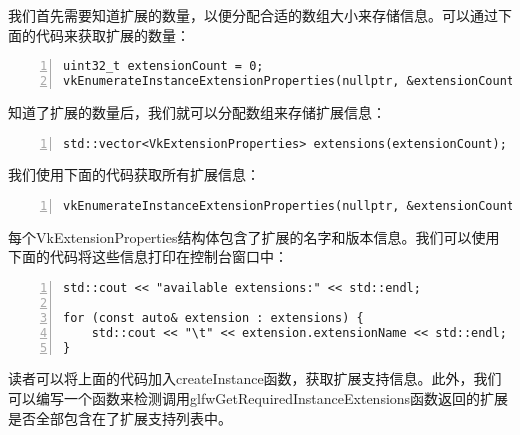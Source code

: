 \documentclass{ctexart}
\begin{document}
我们首先需要知道扩展的数量，以便分配合适的数组大小来存储信息。可以通过下面的代码来获取扩展的数量：

\begin{lstlisting}[language={[ANSI]C},keywordstyle=\color{blue!70},commentstyle=\color{red!50!green!50!blue!50},frame=shadowbox, rulesepcolor=\color{red!20!green!20!blue!20},basicstyle=\small,numbers=left, numberstyle=\tiny,breaklines=true]
uint32_t extensionCount = 0;
vkEnumerateInstanceExtensionProperties(nullptr, &extensionCount, nullptr);
\end{lstlisting}

知道了扩展的数量后，我们就可以分配数组来存储扩展信息：

\begin{lstlisting}[language={[ANSI]C},keywordstyle=\color{blue!70},commentstyle=\color{red!50!green!50!blue!50},frame=shadowbox, rulesepcolor=\color{red!20!green!20!blue!20},basicstyle=\small,numbers=left, numberstyle=\tiny,breaklines=true]
std::vector<VkExtensionProperties> extensions(extensionCount);
\end{lstlisting}

我们使用下面的代码获取所有扩展信息：

\begin{lstlisting}[language={[ANSI]C},keywordstyle=\color{blue!70},commentstyle=\color{red!50!green!50!blue!50},frame=shadowbox, rulesepcolor=\color{red!20!green!20!blue!20},basicstyle=\small,numbers=left, numberstyle=\tiny,breaklines=true]
vkEnumerateInstanceExtensionProperties(nullptr, &extensionCount, extensions.data());
\end{lstlisting}

每个VkExtensionProperties结构体包含了扩展的名字和版本信息。我们可以使用下面的代码将这些信息打印在控制台窗口中：

\begin{lstlisting}[language={[ANSI]C},keywordstyle=\color{blue!70},commentstyle=\color{red!50!green!50!blue!50},frame=shadowbox, rulesepcolor=\color{red!20!green!20!blue!20},basicstyle=\small,numbers=left, numberstyle=\tiny,breaklines=true]
std::cout << "available extensions:" << std::endl;

for (const auto& extension : extensions) {
	std::cout << "\t" << extension.extensionName << std::endl;
}
\end{lstlisting}

读者可以将上面的代码加入createInstance函数，获取扩展支持信息。此外，我们可以编写一个函数来检测调用glfwGetRequiredInstanceExtensions函数返回的扩展是否全部包含在了扩展支持列表中。
\end{document}
